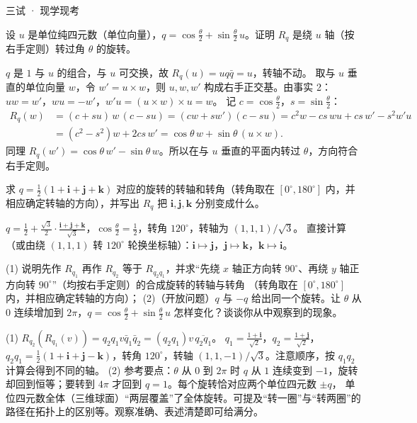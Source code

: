 \documentclass[cjk=noto, seal=first]{mojing-exam}
\begin{document}
\begin{paper}[time={建议 2.5 小时，含阅读（训练设置）}, full=100]{三试 · 现学现考}
\begin{questions}
\question[12] 设 $u$ 是单位纯四元数（单位向量），$q=\cos\frac\theta2+\sin\frac\theta2\,u$。证明 $R_q$ 是绕 $u$ 轴（按右手定则）转过角 $\theta$ 的旋转。
\answerspace{3cm}
\begin{solution}
$q$ 是 $1$ 与 $u$ 的组合，与 $u$ 可交换，故 $R_q(u)=uq\bar q=u$，转轴不动。
取与 $u$ 垂直的单位向量 $w$，令 $w'=u\times w$，则 $u,w,w'$ 构成右手正交基。由事实 2：$uw=w'$，$wu=-w'$，$w'u=(u\times w)\times u=w$。
记 $c=\cos\frac\theta2$，$s=\sin\frac\theta2$：
\begin{align*}
  R_q(w)&=(c+su)\,w\,(c-su)=(cw+sw')(c-su)=c^2w-cs\,wu+cs\,w'-s^2w'u\\
  &=(c^2-s^2)w+2cs\,w'=\cos\theta\,w+\sin\theta\,(u\times w).
\end{align*}
同理 $R_q(w')=\cos\theta\,w'-\sin\theta\,w$。所以在与 $u$ 垂直的平面内转过 $\theta$，方向符合右手定则。
\end{solution}

\question[8] 求 $q=\frac12(1+\mathbf i+\mathbf j+\mathbf k)$ 对应的旋转的转轴和转角（转角取在 $[0^\circ,180^\circ]$ 内，并相应确定转轴的方向），并写出 $R_q$ 把 $\mathbf i,\mathbf j,\mathbf k$ 分别变成什么。
\answerspace{2.5cm}
\begin{solution}
$q=\frac12+\frac{\sqrt3}2\cdot\frac{\mathbf i+\mathbf j+\mathbf k}{\sqrt3}$，$\cos\frac\theta2=\frac12$，转角 $120^\circ$，转轴为 $(1,1,1)/\sqrt3$。
直接计算（或由绕 $(1,1,1)$ 转 $120^\circ$ 轮换坐标轴）：$\mathbf i\mapsto\mathbf j$，$\mathbf j\mapsto\mathbf k$，$\mathbf k\mapsto\mathbf i$。
\end{solution}

\question[6] (1) 说明先作 $R_{q_1}$ 再作 $R_{q_2}$ 等于 $R_{q_2q_1}$，并求“先绕 $x$ 轴正方向转 $90^\circ$、再绕 $y$ 轴正方向转 $90^\circ$”（均按右手定则）的合成旋转的转轴与转角
（转角取在 $[0^\circ,180^\circ]$ 内，并相应确定转轴的方向）；
(2)（开放问题）$q$ 与 $-q$ 给出同一个旋转。让 $\theta$ 从 $0$ 连续增加到 $2\pi$，$q=\cos\frac\theta2+\sin\frac\theta2\,u$ 怎样变化？谈谈你从中观察到的现象。
\answerspace{3cm}
\begin{solution}
(1) $R_{q_2}(R_{q_1}(v))=q_2q_1v\bar q_1\bar q_2=(q_2q_1)v\,\overline{q_2q_1}$。
$q_1=\frac{1+\mathbf i}{\sqrt2}$，$q_2=\frac{1+\mathbf j}{\sqrt2}$，$q_2q_1=\frac12(1+\mathbf i+\mathbf j-\mathbf k)$，转角 $120^\circ$，转轴 $(1,1,-1)/\sqrt3$。注意顺序，按 $q_1q_2$ 计算会得到不同的轴。
(2) 参考要点：$\theta$ 从 $0$ 到 $2\pi$ 时 $q$ 从 $1$ 连续变到 $-1$，旋转却回到恒等；要转到 $4\pi$ 才回到 $q=1$。每个旋转恰对应两个单位四元数 $\pm q$，
单位四元数全体（三维球面）“两层覆盖”了全体旋转。可提及“转一圈”与“转两圈”的路径在拓扑上的区别等。观察准确、表述清楚即可给满分。
\end{solution}
\end{questions}


\end{paper}
\end{document}
